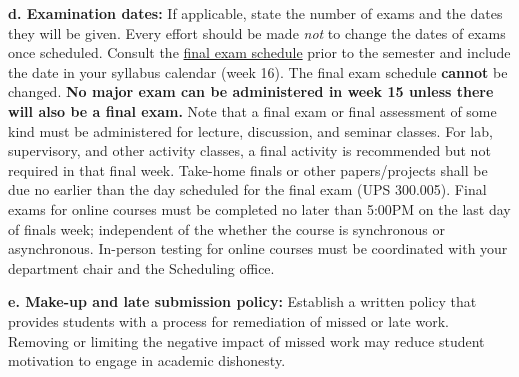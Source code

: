 \documentclass[12pt]{article} %
\begin{document}
\noindent \textbf{d. Examination dates:} {\color{annotationblue}If applicable, state the number of exams and the dates they will be given. Every effort should be made \textit{not} to change the dates of exams once scheduled. Consult the \href{https://www.fullerton.edu/scheduling/final_exam_schedule/}{final exam schedule} prior to the semester and include the date in your syllabus calendar (week 16). The final exam schedule \textbf{cannot} be changed. \textbf{No major exam can be administered in week 15 unless there will also be a final exam.} Note that a final exam or final assessment of some kind must be administered for lecture, discussion, and seminar classes. For lab, supervisory, and other activity classes, a final activity is recommended but not required in that final week. Take-home finals or other papers/projects shall be due no earlier than the day scheduled for the final exam (UPS 300.005). Final exams for online courses must be completed no later than 5:00PM on the last day of finals week; independent of the whether the course is synchronous or asynchronous. In-person testing for online courses must be coordinated with your department chair and the Scheduling office.}

\vspace{0.5em}


\vspace{0.5em}


\vspace{1em}

\noindent \textbf{e. Make-up and late submission policy:} {\color{annotationblue}Establish a written policy that provides students with a process for remediation of missed or late work. Removing or limiting the negative impact of missed work may reduce student motivation to engage in academic dishonesty.}
\end{document}
